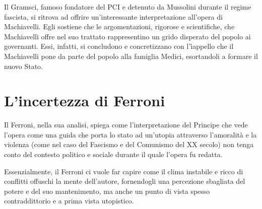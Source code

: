 \documentclass[10pt,a4paper]{report}
\begin{document}
	Il Gramsci, famoso fondatore del PCI e detenuto da Mussolini durante il regime fascista, si ritrova ad offrire un'interessante interpretazione all'opera di Machiavelli. Egli sostiene che le argomentazioni, rigorose e scientifiche, che Machiavelli offre nel suo trattato rappresentino un grido disperato del popolo ai governanti. Essi, infatti, si concludono e concretizzano con l'ìappello che il Machiavelli pone da parte del popolo alla famiglia Medici, esortandoli a formare il nuovo Stato.
	
	\section*{L'incertezza di Ferroni}
	
	Il Ferroni, nella sua analisi, spiega come l'interpretazione del Principe che vede l'opera come una guida che porta lo stato ad un'utopia attraverso l'amoralità e la violenza (come nel caso del Fascismo e del Comunismo del XX secolo) non tenga conto del contesto politico e sociale durante il quale l'opera fu redatta. 
	
	Essenzialmente, il Ferroni ci vuole far capire come il clima instabile e ricco di conflitti offuschi la mente dell'autore, fornendogli una percezione sbagliata del potere e del suo mantenimento, ma anche un punto di vista spesso contraddittorio e a prima vista utopistico.   
	
\end{document}
